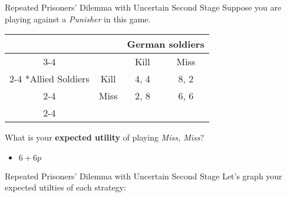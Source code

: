 \begin{frame}{Repeated Prisoners' Dilemma with Uncertain Second Stage}
  Suppose you are playing against a \textit{Punisher} in this game. 

  \begin{center}
    \begin{tabular}{*{4}{c|}}
      \multicolumn{2}{c}{} & \multicolumn{2}{c}{German soldiers} \\ \cline{3-4}
      \multicolumn{1}{c}{} &    & Kill & Miss \\ \cline{2-4}
      \multirow{2}*{Allied Soldiers} & Kill & 4, 4 & 8, 2 \\ \cline{2-4}
                         & Miss & 2, 8 & 6, 6 \\ \cline{2-4} 
    \end{tabular} 
  \end{center}

  What is your \textbf{expected utility} of playing \textit{Miss, Miss}?
  \begin{itemize}
      \item $6 + 6p$
  \end{itemize}
\end{frame}

\begin{frame}{Repeated Prisoners' Dilemma with Uncertain Second Stage}
  Let's graph your expected utilties of each strategy:
\end{frame}

